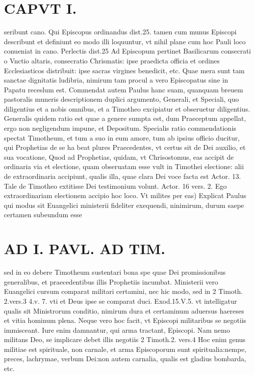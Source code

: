 \documentclass{article}
\begin{document}
\begin{pages}
\section*{CAPVT  I. }
\marginpar{[ p.35 ]}\pstart seribunt cano. Qui Episcopus ordinandus dist.25. tamen cum munus Episcopi describunt et definiunt eo modo illi loquuntur, vt nihil plane cum hoc Pauli loco conueniat in cano. Perlectis dist.25 Ad Episcopum pertinet Basilicarum consecrati o Vnctio altaris, consecratio Chrismatis: ipse praedicta officia et ordines Ecclesiasticos distribuit: ipse sacras virgines benedicit, etc. Quae mera sunt tam sanctae dignitatis ludibria, nimirum tam procul a vero Episcopatus sine in Papatu receslum est. Commendat autem Paulus hanc suam, quanquam breuem pastoralis muneris descriptionem duplici argumento, Generali, et Speciali, quo diligentius et a nobis omnibus, et a Timotheo excipiatur et obseruetur diligentius. Generalis quidem ratio est quae a genere sumpta est, dum Praeceptum appellat, ergo non negligendum impune, et Depositum. Specialis ratio commendationis spectat Timotheum, et tum a suo in eum amore, tum ab ipsius officio ducitur, qui Prophetias de se ha beat plures Praecedentes, vt certus sit de Dei auxilio, et sua vocatione, Quod ad Prophetias, quidam, vt Chrisostomus, eas accipit de ordinaria via et electione, quam obseruatam esse vult in Timothei electione: alii de extraordinaria accipiunt, qualis illa, quae clara Dei voce facta est Actor. 13. Tale de Timotheo extitisse Dei testimonium volunt. Actor. 16 vers. 2. Ego extraordinariam electionem accipio hoc loco. Vt milites per eas) Explicat Paulus qui modus sit Euangelici ministerii fideliter exequendi, ninimirum, durum saepe certamen subeundum esse  \pend
\section*{AD I. PAVL. AD TIM. }
\marginpar{[ p.36 ]}\pstart sed in eo debere Timotheum sustentari bona spe quae Dei promissionibus generalibus, et praecedentibus illis Prophetiis incumbat. Ministerii vero Euangelici cursum comparat militari certamini, nec hic modo, sed in 2 Timoth. 2.vers.3 4.v. 7. vti et Deus ipse se comparat duci. Exod.15.V.5. vt intelligatur qualis sit Ministrorum conditio, nimirum dura et certaminum aduersus haereses et vitia hominum plena. Neque vero hoc facit, vt Episcopi militaribus se negotiis immisceant. Iure enim damnantur, qui arma tractant, Episcopi. Nam nemo militans Deo, se implicare debet illis negotiis 2 Timoth.2. vers.4 Hoc enim genus militiae est spirituale, non carnale, et arma Episcoporum sunt spiritualia:nempe, preces, lachrymae, verbum Dei:non autem carnalia, qualis est gladius bombarda, etc.  \pend\pstart {}
{}

\end{pages}
\end{document}
